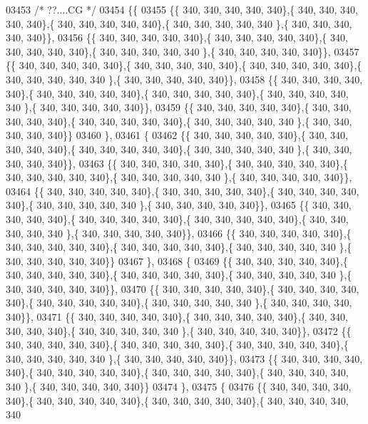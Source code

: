 \begin{DoxyCode}
03453 \textcolor{comment}{/* ??....CG */}
03454 \{\{
03455 \{\{ 340, 340, 340, 340, 340\},\{ 340, 340, 340, 340, 340\},\{ 340, 340, 340, 340, 340\},\{ 340, 340, 340, 340, 340
      \},\{ 340, 340, 340, 340, 340\}\},
03456 \{\{ 340, 340, 340, 340, 340\},\{ 340, 340, 340, 340, 340\},\{ 340, 340, 340, 340, 340\},\{ 340, 340, 340, 340, 340
      \},\{ 340, 340, 340, 340, 340\}\},
03457 \{\{ 340, 340, 340, 340, 340\},\{ 340, 340, 340, 340, 340\},\{ 340, 340, 340, 340, 340\},\{ 340, 340, 340, 340, 340
      \},\{ 340, 340, 340, 340, 340\}\},
03458 \{\{ 340, 340, 340, 340, 340\},\{ 340, 340, 340, 340, 340\},\{ 340, 340, 340, 340, 340\},\{ 340, 340, 340, 340, 340
      \},\{ 340, 340, 340, 340, 340\}\},
03459 \{\{ 340, 340, 340, 340, 340\},\{ 340, 340, 340, 340, 340\},\{ 340, 340, 340, 340, 340\},\{ 340, 340, 340, 340, 340
      \},\{ 340, 340, 340, 340, 340\}\}
03460 \},
03461 \{
03462 \{\{ 340, 340, 340, 340, 340\},\{ 340, 340, 340, 340, 340\},\{ 340, 340, 340, 340, 340\},\{ 340, 340, 340, 340, 340
      \},\{ 340, 340, 340, 340, 340\}\},
03463 \{\{ 340, 340, 340, 340, 340\},\{ 340, 340, 340, 340, 340\},\{ 340, 340, 340, 340, 340\},\{ 340, 340, 340, 340, 340
      \},\{ 340, 340, 340, 340, 340\}\},
03464 \{\{ 340, 340, 340, 340, 340\},\{ 340, 340, 340, 340, 340\},\{ 340, 340, 340, 340, 340\},\{ 340, 340, 340, 340, 340
      \},\{ 340, 340, 340, 340, 340\}\},
03465 \{\{ 340, 340, 340, 340, 340\},\{ 340, 340, 340, 340, 340\},\{ 340, 340, 340, 340, 340\},\{ 340, 340, 340, 340, 340
      \},\{ 340, 340, 340, 340, 340\}\},
03466 \{\{ 340, 340, 340, 340, 340\},\{ 340, 340, 340, 340, 340\},\{ 340, 340, 340, 340, 340\},\{ 340, 340, 340, 340, 340
      \},\{ 340, 340, 340, 340, 340\}\}
03467 \},
03468 \{
03469 \{\{ 340, 340, 340, 340, 340\},\{ 340, 340, 340, 340, 340\},\{ 340, 340, 340, 340, 340\},\{ 340, 340, 340, 340, 340
      \},\{ 340, 340, 340, 340, 340\}\},
03470 \{\{ 340, 340, 340, 340, 340\},\{ 340, 340, 340, 340, 340\},\{ 340, 340, 340, 340, 340\},\{ 340, 340, 340, 340, 340
      \},\{ 340, 340, 340, 340, 340\}\},
03471 \{\{ 340, 340, 340, 340, 340\},\{ 340, 340, 340, 340, 340\},\{ 340, 340, 340, 340, 340\},\{ 340, 340, 340, 340, 340
      \},\{ 340, 340, 340, 340, 340\}\},
03472 \{\{ 340, 340, 340, 340, 340\},\{ 340, 340, 340, 340, 340\},\{ 340, 340, 340, 340, 340\},\{ 340, 340, 340, 340, 340
      \},\{ 340, 340, 340, 340, 340\}\},
03473 \{\{ 340, 340, 340, 340, 340\},\{ 340, 340, 340, 340, 340\},\{ 340, 340, 340, 340, 340\},\{ 340, 340, 340, 340, 340
      \},\{ 340, 340, 340, 340, 340\}\}
03474 \},
03475 \{
03476 \{\{ 340, 340, 340, 340, 340\},\{ 340, 340, 340, 340, 340\},\{ 340, 340, 340, 340, 340\},\{ 340, 340, 340, 340, 340

\end{DoxyCode}
